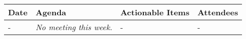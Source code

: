 \begin{table}[!h]
    \centering
    \begin{tabularx}{\textwidth}{|l|X|X|X|}
        \hline
        Date & Agenda & Actionable Items & Attendees \\
        \hline
        \hline
        - & 
        \textit{No meeting this week.} &
        - & 
        - \\
        \hline
    \end{tabularx}
\end{table}
